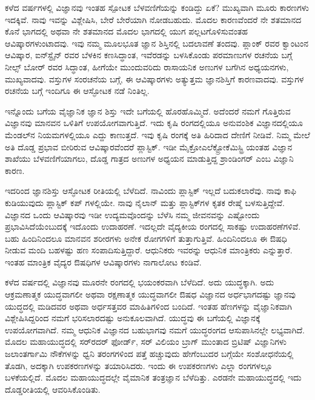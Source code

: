 
ಕಳೆದ  ವರ್ಷಗಳಲ್ಲಿ ವಿಜ್ಞಾನವು ಇಂತಹ ಸ್ಪೋಟಕ ಬೆಳವಣಿಗೆಯನ್ನು ಕಂಡಿದ್ದು ಏಕೆ? ಮುಖ್ಯವಾಗಿ ಮೂರು ಕಾರಣಗಳು ಇದಕ್ಕಿವೆ. ನಾವು ಇವನ್ನು ವಿಶ್ಲೇಷಿಸಿ, ಬೇರೆ ಬೇರೆಯಾಗಿ ನೋಡಬಹುದು. ಮೊದಲ ಕಾರಣವೆಂದರೆ ನೇ ಶತಮಾನದ ಕೊನೆ ಭಾಗದಲ್ಲಿ ಅಥವಾ ನೇ ಶತಮಾನದ ಮೊದಲ ಭಾಗದಲ್ಲಿ ಯುಗ ಪಲ್ಲಟಗೊಳಿಸುವಂತಹ ಆವಿಷ್ಕಾರಗಳುಂಟಾದವು. ಇವು ನಮ್ಮ ಮೂಲಭೂತ ಜ್ಞಾನ ಶಿಸ್ತಿನಲ್ಲಿ ಬದಲಾವಣೆ ತಂದವು. ಪ್ಲಾಂಕ್ ರವರ ಕ್ವಾಂಟಂನ ಆವಿಷ್ಕಾರ, ಐನ್‍ಸ್ಟೈನ್ ರವರ ಬೆಳಕಿನ ಕಣಸಿದ್ಧಾಂತ, ಇವೆರಡನ್ನು ಬಳಸಿಕೊಂಡು ಪರಮಾಣುಗಳ ರಚನೆಯ ಬಗ್ಗೆ ನೀಲ್ಸ್ ಬೋರ್ ರವರ ಸಿದ್ಧಾಂತ, ಹೀಗೆಯೇ ಮುಂದುವರಿದು ರಾಸಾಯನಿಕ ಅಣುಗಳ ಬಗೆಗಿನ ಅಧ್ಯಯನಗಳು, ಮುಖ್ಯವಾದವು. ವಸ್ತುಗಳ ಸಂರಚನೆಯ ಬಗ್ಗೆ, ಈ ಆವಿಷ್ಕಾರಗಳು ಅತ್ಯುತ್ತಮ ಜ್ಞಾನಶಿಸ್ತಿಗೆ ಕಾರಣವಾದವು. ವಸ್ತುಗಳ ರಚನೆಯ ಬಗ್ಗೆ ಇಂದಿಗೂ ಈ ಆಸ್ಫೋಟಕ ನಡೆ ನಿಂತಿಲ್ಲ.

ಇನ್ನೊಂದು ಬಗೆಯ ವೈಜ್ಞಾನಿಕ ಜ್ಞಾನ ಶಿಸ್ತು ಇದೇ ಬಗೆಯಲ್ಲಿ ಹೊರಹೊಮ್ಮಿದೆ. ಅದೆಂದರೆ ನಮಗೆ ಗೊತ್ತಿರುವ ವಿಜ್ಞಾನವು ಮಾನವನ ಒಳಿತಿಗೆ ಉಪಯೋಗವಾಗುತ್ತಿದೆ. ಇದು ಕೃಷಿ ರಂಗದಲ್ಲಿಯೂ ಅನುವಂಶಿಕ ವಿಜ್ಞಾನದಲ್ಲಿಯೂ ಮೆಂಡಲ್‍ನ ನಿಯಮಗಳಲ್ಲಿಯೂ ಎದ್ದು ಕಾಣುತ್ತದೆ. ಇವು ಕೃಷಿ ರಂಗಕ್ಕೆ ಅತಿ ಹಿರಿದಾದ ದೇಣಿಗೆ ನೀಡಿವೆ. ನಿಮ್ಮ ಮೇಲೆ ಅತಿ ದೊಡ್ಡ ಪ್ರಭಾವ ಬೀರಿರುವ ಆವಿಷ್ಕಾರವೆಂದರೆ ಪ್ಲಾಸ್ಟಿಕ್. ಇಡೀ ಮೈಕ್ರೋ\enginline{--}ಎಲೆಕ್ಟ್ರೋಕೆಮಿಸ್ಟ್ರಿ ಯಂತಹ ವಿಜ್ಞಾನ ಶಾಖೆಯು ಬೆಳವಣಿಗೆಯಾಗಲು, ದೊಡ್ಡ ಗಾತ್ರದ ಅಣುಗಳ ಅಧ್ಯಯನ ಮಾಡುತ್ತಿದ್ದ ಶ್ರಾಂಡಿಂಗರ್ ಎಂಬ ವಿಜ್ಞಾನಿ ಕಾರಣ.

ಇದರಿಂದ ಜ್ಞಾನಶಿಸ್ತು ಆಸ್ಫೋಟಕ ರೀತಿಯಲ್ಲಿ ಬೆಳೆದಿದೆ. ನಾವಿಂದು ಪ್ಲಾಸ್ಟಿಕ್ ಇಲ್ಲದೆ ಬದುಕಲಾರೆವು. ನಾವು ಕಾಫಿ ಕುಡಿಯುವುದು ಪ್ಲಾಸ್ಟಿಕ್ ಕಪ್ ಗಳಲ್ಲಿಯೇ. ನಾವು ನೈಲಾನ್ ಮತ್ತು ಪ್ಲಾಸ್ಟಿಕ್‍ಗಳ ಕೃತಕ ರೇಷ್ಮೆ ಬಳಸುತ್ತಿದ್ದೇವೆ. ವಿಜ್ಞಾನದ ಒಂದು ಆವಿಷ್ಕಾರವು ಇಡೀ ಉದ್ಯಮವೊಂದನ್ನು ಬೆಳೆಸಿ ನಮ್ಮ ಜೀವನವನ್ನು ಎಷ್ಟೋಂದು ಪ್ರಭಾವಿಸಿದೆಯೆಂಬುದಕ್ಕೆ ಇದೊಂದು ಉದಾಹರಣೆ. ಇದಲ್ಲದೇ ವೈದ್ಯಕೀಯ ರಂಗದಲ್ಲಿ ಸಾಕಷ್ಟು ಉದಾಹರಣೆಗಳಿವೆ. ಬಹು ಹಿಂದಿನಿಂದಲೂ ಮಾನವನ ಶರೀರಗಳು ಅನೇಕ ರೋಗಗಳಿಗೆ ತುತ್ತಾಗುತ್ತಿವೆ. ಹಿಂದಿನಿಂದಲೂ ಈ ಔಷಧಿ ನೀಡುವ ಮಂದಿ ಬಹಳಷ್ಟು ಹಣ ಸಂಪಾದಿಸುತ್ತಿದ್ದಾರೆ. ಆಧುನಿಕರು ಇವರನ್ನು ಆಧುನಿಕ ಮಾಂತ್ರಿಕರು ಎನ್ನುತ್ತಾರೆ. ಇಂತಹ ಮಾಂತ್ರಿಕ ವೈದ್ಯರ ಔಷಧಿಗಳ ಆವಿಷ್ಕಾರಗಳು ನಾಗಾಲೋಟ ಕಂಡಿವೆ.

ಕಳೆದ  ವರ್ಷದಲ್ಲಿ ವಿಜ್ಞಾನವು ಮೂರನೇ ರಂಗದಲ್ಲಿ ಭಯಂಕರವಾಗಿ ಬೆಳೆದಿದೆ. ಅದು ಯುದ್ಧಕ್ಕಾಗಿ. ಅದು ಆಕ್ರಮಣಾತ್ಮಕ ಯುದ್ಧವಾಗಲೀ ಅಥವಾ ರಕ್ಷಣಾತ್ಮಕ ಯುದ್ಧವಾಗಲೀ ಔಷಧ ವಿಜ್ಞಾನದ ಅರ್ಧಭಾಗದಷ್ಟು ಜ್ಞಾನವು ಯುದ್ಧದಲ್ಲಿ ಮಡಿದವರ ಅಥವಾ ಅರ್ಧಸತ್ತವರ ಮಾಹಿತಿಗಳಿಂದ ಬಂದಿದೆ. ಇಂತಹ ಹೆಣಗಳನ್ನು ವೈಜ್ಞಾನಿಕವಾಗಿ ವಿಶ್ಲೇಷಿಸಿದ್ದರಿಂದ ನಮಗೆ ಭರಿಸಲಾರದಷ್ಟು ಅನುಕೂಲವಾಗಿದೆ. ಯುದ್ಧವು ಈ ಬಗೆಯಲ್ಲಿ ವಿಜ್ಞಾನಕ್ಕೆ ಉಪಯೋಗವಾಗಿದೆ. ನಮ್ಮ ಆಧುನಿಕ ವಿಜ್ಞಾನದ ಬಹುಭಾಗವು ನಮಗೆ ಯುದ್ಧರಂಗದ ಆಸುಪಾಸಿನಲ್ಲೇ ಲಭ್ಯವಾಗಿದೆ. ಮೊದಲ ಮಹಾಯುದ್ಧದಲ್ಲಿ ಸರ್‌ರದರ್ ಫೋರ್ಡ್, ಸರ್ ವಿಲಿಯಂ ಬ್ರಾಗ್ ಮುಂತಾದ ಬ್ರಿಟಿಷ್ ವಿಜ್ಞಾನಿಗಳು ಜಲಾಂತರ್ಗಾಮಿ ನೌಕೆಗಳನ್ನು ಧ್ವನಿ ತರಂಗಗಳಿಂದ ಪತ್ತೆ ಹಚ್ಚುವುದು ಹೇಗೆಂಬುದರ ಬಗ್ಗೆಯೇ ಸಂಶೋಧನೆಯಲ್ಲಿ ತೊಡಗಿ, ಅದಕ್ಕಾಗಿ ಉಪಕರಣಗಳನ್ನು ತಯಾರಿಸಿದರು. ಇಂದು ಈ ಉಪಕರಣಗಳು ಎಲ್ಲಾ ರಂಗಗಳಲ್ಲೂ ಬಳಕೆಯಲ್ಲಿದೆ. ಮೊದಲ ಮಹಾಯುದ್ಧದಲ್ಲೇ ವೈಮಾನಿಕ ತಂತ್ರಜ್ಞಾನ ಬೆಳೆದಿತ್ತು. ಎರಡನೇ ಮಹಾಯುದ್ಧದಲ್ಲಿ ಇದು ದೊಡ್ಡರೀತಿಯಲ್ಲಿ ಆವರಿಸಿಕೊಂಡಿತು.

